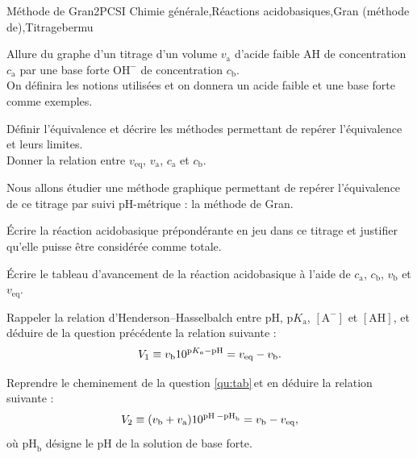 
\begin{exercise}{Méthode de Gran}{2}{PCSI}
{Chimie générale,Réactions acidobasiques,Gran (méthode de),Titrage}{bermu}

\begin{questions}
\questioncours Allure du graphe d'un titrage d'un volume $v_\text{a}$ d'acide faible AH de concentration $c_\text{a}$ par une base forte $\mathrm{OH^-}$ de concentration $c_\text{b}$. \\
On définira les notions utilisées et on donnera un acide faible et une base forte comme exemples.

\question\label{qu:eqi} Définir l'équivalence et décrire les méthodes permettant de repérer l'équivalence et leurs limites. \\
Donner la relation entre $v_\text{eq}$, $v_\text{a}$, $c_\text{a}$ et $c_\text{b}$.

\begin{EnvUplevel}
    Nous allons étudier une méthode graphique permettant de repérer l'équivalence de ce titrage par suivi pH-métrique : la méthode de Gran.
\end{EnvUplevel}

\question \'Ecrire la réaction acidobasique prépondérante en jeu dans ce titrage et justifier qu'elle puisse être considérée comme totale.


\question\label{qu:tab} \'Ecrire le tableau d'avancement de la réaction acidobasique à l'aide de $c_\text{a}$, $c_\text{b}$, $v_\text{b}$ et $v_\text{eq}$.

\question Rappeler la relation d'Henderson--Hasselbalch entre pH, p$K_\text{a}$, $\mathrm{[A^-]}$ et $\mathrm{[AH]}$, et déduire de la question précédente la relation suivante : \vspace{-.5em}
$$V_1 \equiv v_\text{b} 10^{\text{p}K_a-\text{pH}} = v_\text{eq} - v_\text{b}.\vspace{-1em}$$


\question Reprendre le cheminement de la question \ref{qu:tab}\,et en déduire la relation suivante : \vspace{-.5em}
$$V_2 \equiv (v_\text{b} + v_\text{a}) 10^{\text{pH}_{\,}-\text{pH}_\text{b}} = v_\text{b} - v_\text{eq}, \vspace{-.8em}$$
où $\text{pH}_\text{b}$ désigne le pH de la solution de base forte.


\end{questions}
\end{exercise}
